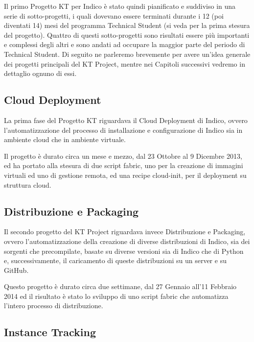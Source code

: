     	Il primo Progetto KT per Indico è stato quindi pianificato e suddiviso in una serie di sotto-progetti, i quali dovevano essere terminati durante i 12 (poi diventati 14) mesi del programma Technical Student (si veda \cite{pedro:gist} per la prima stesura del progetto). Quattro di questi sotto-progetti sono risultati essere più importanti e complessi degli altri e sono andati ad occupare la maggior parte del periodo di Technical Student. Di seguito ne parleremo brevemente per avere un'idea generale dei progetti principali del KT Project, mentre nei Capitoli successivi vedremo in dettaglio ognuno di essi.
    	
    	\subsection{Cloud Deployment} \label{subsec:p;pp;cloud}
    	
        	La prima fase del Progetto KT riguardava il Cloud Deployment di Indico, ovvero l'automatizzazione del processo di installazione e configurazione di Indico sia in ambiente cloud che in ambiente virtuale.
        	
        	Il progetto è durato circa un mese e mezzo, dal 23 Ottobre al 9 Dicembre 2013, ed ha portato alla stesura di due script fabric, uno per la creazione di immagini virtuali ed uno di gestione remota, ed una recipe cloud-init, per il deployment su struttura cloud.
    	
    	\subsection{Distribuzione e Packaging} \label{subsec:p;pp:distribuzione}
    	
        	Il secondo progetto del KT Project riguardava invece Distribuzione e Packaging, ovvero l'automatizzazione della creazione di diverse distribuzioni di Indico, sia dei sorgenti che precompilate, basate su diverse versioni sia di Indico che di Python e, successivamente, il caricamento di queste distribuzioni su un server e su GitHub.
        	
        	Questo progetto è durato circa due settimane, dal 27 Gennaio all'11 Febbraio 2014 ed il risultato è stato lo sviluppo di uno script fabric che automatizza l'intero processo di distribuzione.
    	
    	\subsection{Instance Tracking} \label{subsec:p;pp;instance_tracker}
    	
